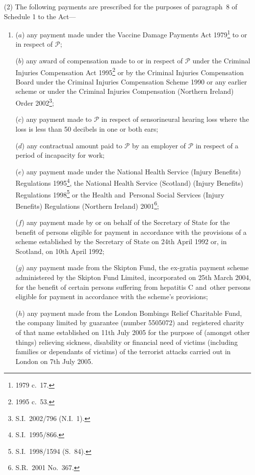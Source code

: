 \documentclass[12pt,a4paper]{article}
\begin{document}
(2) The following payments are prescribed for the purposes of paragraph~8 of Schedule 1 to the Act—
\begin{enumerate}\item[]
($a$) any payment made under the Vaccine Damage Payments Act 1979\footnote{1979 c.~17.} to or in respect of $\mathcal{P}$;

($b$) any award of compensation made to or in respect of $\mathcal{P}$ under the Criminal Injuries Compensation Act 1995\footnote{1995 c.~53.} or by the Criminal Injuries Compensation Board under the Criminal Injuries Compensation Scheme 1990 or any earlier scheme or under the Criminal Injuries Compensation (Northern Ireland) Order 2002\footnote{S.I.~2002/796 (N.I.~1).};

($c$) any payment made to $\mathcal{P}$ in respect of sensorineural hearing loss where the loss is less than 50 decibels in one or both ears;

($d$) any contractual amount paid to $\mathcal{P}$ by an employer of $\mathcal{P}$ in respect of a period of incapacity for work;

($e$) any payment made under the National Health Service (Injury Benefits) Regulations 1995\footnote{S.I.~1995/866.}, the National Health Service (Scotland) (Injury Benefits) Regulations 1998\footnote{S.I.~1998/1594 (S.~84).} or the Health and~Personal Social Services (Injury Benefits) Regulations (Northern Ireland) 2001\footnote{S.R.~2001 No.~367.};

($f$) any payment made by or on behalf of the Secretary of State for the benefit of persons eligible for payment in accordance with the provisions of a scheme established by the Secretary of State on 24th April 1992 or, in Scotland, on 10th April 1992;

($g$) any payment made from the Skipton Fund, the ex-gratia payment scheme administered by the Skipton Fund Limited, incorporated on 25th March 2004, for the benefit of certain persons suffering from hepatitis C and~other persons eligible for payment in accordance with the scheme’s provisions;

($h$) any payment made from the London Bombings Relief Charitable Fund, the company limited by guarantee (number 5505072) and~registered charity of that name established on 11th July 2005 for the purpose of (amongst other things) relieving sickness, disability or financial need of victims (including families or dependants of victims) of the terrorist attacks carried out in London on 7th July 2005.
\end{enumerate}
\end{document}
